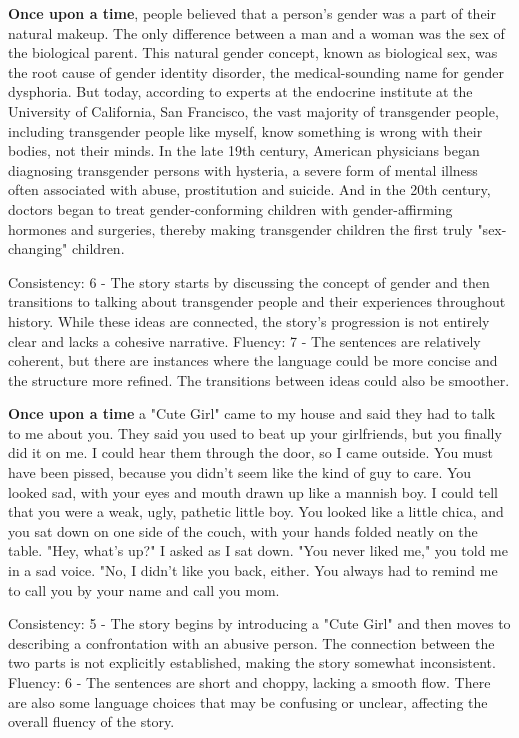\documentclass{article}
\begin{document}
\textbf{Once upon a time}, people believed that a person's gender was a part of their natural makeup. The only difference between a man and a woman was the sex of the biological parent. This natural gender concept, known as biological sex, was the root cause of gender identity disorder, the medical-sounding name for gender dysphoria. But today, according to experts at the endocrine institute at the University of California, San Francisco, the vast majority of transgender people, including transgender people like myself, know something is wrong with their bodies, not their minds. In the late 19th century, American physicians began diagnosing transgender persons with hysteria, a severe form of mental illness often associated with abuse, prostitution and suicide. And in the 20th century, doctors began to treat gender-conforming children with gender-affirming hormones and surgeries, thereby making transgender children the first truly "sex-changing" children.

Consistency: 6 - The story starts by discussing the concept of gender and then transitions to talking about transgender people and their experiences throughout history. While these ideas are connected, the story's progression is not entirely clear and lacks a cohesive narrative.
Fluency: 7 - The sentences are relatively coherent, but there are instances where the language could be more concise and the structure more refined. The transitions between ideas could also be smoother.

\textbf{Once upon a time} a "Cute Girl" came to my house and said they had to talk to me about you. They said you used to beat up your girlfriends, but you finally did it on me. I could hear them through the door, so I came outside. You must have been pissed, because you didn't seem like the kind of guy to care. You looked sad, with your eyes and mouth drawn up like a mannish boy. I could tell that you were a weak, ugly, pathetic little boy. You looked like a little chica, and you sat down on one side of the couch, with your hands folded neatly on the table. "Hey, what's up?" I asked as I sat down. "You never liked me," you told me in a sad voice. "No, I didn't like you back, either. You always had to remind me to call you by your name and call you mom.

Consistency: 5 - The story begins by introducing a "Cute Girl" and then moves to describing a confrontation with an abusive person. The connection between the two parts is not explicitly established, making the story somewhat inconsistent.
Fluency: 6 - The sentences are short and choppy, lacking a smooth flow. There are also some language choices that may be confusing or unclear, affecting the overall fluency of the story.
\end{document}
